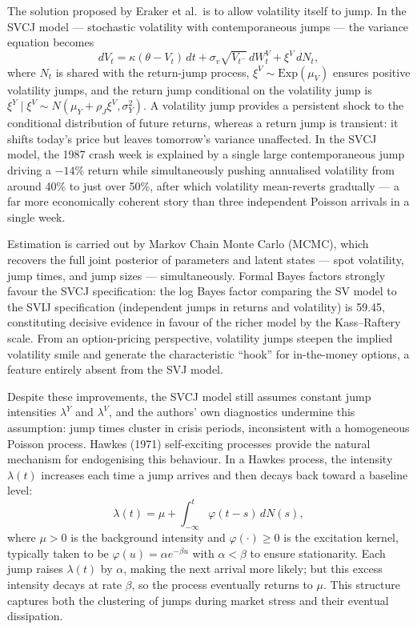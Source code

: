 \documentclass[12pt]{article}
\begin{document}
The solution proposed by Eraker et al.\ is to allow volatility itself to jump. In the SVCJ model --- stochastic volatility with contemporaneous jumps --- the variance equation becomes
\begin{equation}
dV_t = \kappa(\theta - V_t)\,dt + \sigma_v\sqrt{V_{t^-}}\,dW^V_t + \xi^V\,dN_t,
\end{equation}
where $N_t$ is shared with the return-jump process, $\xi^V \sim \mathrm{Exp}(\mu_V)$ ensures positive volatility jumps, and the return jump conditional on the volatility jump is $\xi^Y \mid \xi^V \sim N(\mu_Y + \rho_J\xi^V, \sigma_Y^2)$. A volatility jump provides a persistent shock to the conditional distribution of future returns, whereas a return jump is transient: it shifts today's price but leaves tomorrow's variance unaffected. In the SVCJ model, the 1987 crash week is explained by a single large contemporaneous jump driving a $-14\%$ return while simultaneously pushing annualised volatility from around 40\% to just over 50\%, after which volatility mean-reverts gradually --- a far more economically coherent story than three independent Poisson arrivals in a single week.

Estimation is carried out by Markov Chain Monte Carlo (MCMC), which recovers the full joint posterior of parameters and latent states --- spot volatility, jump times, and jump sizes --- simultaneously. Formal Bayes factors strongly favour the SVCJ specification: the log Bayes factor comparing the SV model to the SVIJ specification (independent jumps in returns and volatility) is 59.45, constituting decisive evidence in favour of the richer model by the Kass--Raftery scale. From an option-pricing perspective, volatility jumps steepen the implied volatility smile and generate the characteristic ``hook'' for in-the-money options, a feature entirely absent from the SVJ model.

Despite these improvements, the SVCJ model still assumes constant jump intensities $\lambda^Y$ and $\lambda^V$, and the authors' own diagnostics undermine this assumption: jump times cluster in crisis periods, inconsistent with a homogeneous Poisson process. Hawkes (1971) self-exciting processes provide the natural mechanism for endogenising this behaviour. In a Hawkes process, the intensity $\lambda(t)$ increases each time a jump arrives and then decays back toward a baseline level:
\begin{equation}
\lambda(t) = \mu + \int_{-\infty}^{t}\varphi(t-s)\,dN(s),
\end{equation}
where $\mu > 0$ is the background intensity and $\varphi(\cdot) \geq 0$ is the excitation kernel, typically taken to be $\varphi(u) = \alpha e^{-\beta u}$ with $\alpha < \beta$ to ensure stationarity. Each jump raises $\lambda(t)$ by $\alpha$, making the next arrival more likely; but this excess intensity decays at rate $\beta$, so the process eventually returns to $\mu$. This structure captures both the clustering of jumps during market stress and their eventual dissipation.
\end{document}
